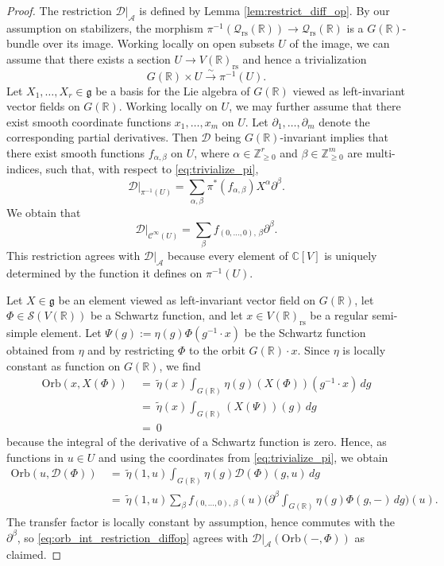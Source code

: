 \documentclass[reqno, 11pt]{amsart} %
\numberwithin{equation}{section}
\theoremstyle{plain}
\theoremstyle{definition}
\theoremstyle{remark}
\newcommand{\mr}{\mathrm}
\newcommand{\wt}{\widetilde}
\newcommand{\lr}{\longrightarrow}
\newcommand{\mbC}{\mathbb{C}}
\newcommand{\mbR}{\mathbb{R}}
\newcommand{\mbZ}{\mathbb{Z}}
\newcommand{\mcA}{\mathcal{A}}
\newcommand{\mcC}{\mathcal{C}}
\newcommand{\mcD}{\mathcal{D}}
\newcommand{\mcQ}{\mathcal{Q}}
\newcommand{\mcS}{\mathcal{S}}
\newcommand{\mfg}{\mathfrak{g}}
\newcommand{\rs}{\mr{rs}}
\newcommand{\simlr}{\overset{\sim}{\lr}}
\newcommand{\Orb}{\mathrm{Orb}}
\begin{document}
\begin{proof}
The restriction $\mcD\vert_\mcA$ is defined by Lemma \ref{lem:restrict_diff_op}. By our assumption on stabilizers, the morphism $π^{-1}(\mcQ_\rs(\mbR))\to \mcQ_\rs(\mbR)$ is a $G(\mbR)$-bundle over its image. Working locally on open subsets $U$ of the image, we can assume that there exists a section $U\to V(\mbR)_\rs$ and hence a trivialization
\begin{equation}\label{eq:trivialize_pi}
G(\mbR)\times U \simlr π^{-1}(U).
\end{equation}
Let $X_1,\ldots,X_r \in \mfg$ be a basis for the Lie algebra of $G(\mbR)$ viewed as left-invariant vector fields on $G(\mbR)$. Working locally on $U$, we may further assume that there exist smooth coordinate functions $x_1,\ldots,x_m$ on $U$. Let $\partial_1,\ldots, \partial_m$ denote the corresponding partial derivatives. Then $\mcD$ being $G(\mbR)$-invariant implies that there exist smooth functions $f_{α,β}$ on $U$, where $α\in \mbZ_{\geq 0}^r$ and $β\in \mbZ_{\geq 0}^m$ are multi-indices, such that, with respect to \eqref{eq:trivialize_pi},
$$\mcD\vert_{π^{-1}(U)} = \sum_{α, β} π^*(f_{α,β}) X^α\partial^β.$$
We obtain that
$$\mcD\vert_{\mcC^\infty(U)} = \sum_{β} f_{(0,\ldots,0),\, β} \partial^β.$$
This restriction agrees with $\mcD\vert_{\mcA}$ because every element of $\mbC[V]$ is uniquely determined by the function it defines on $π^{-1}(U)$.

Let $X\in \mfg$ be an element viewed as left-invariant vector field on $G(\mbR)$, let $Φ\in \mcS(V(\mbR))$ be a Schwartz function, and let $x\in V(\mbR)_\rs$ be a regular semi-simple element. Let $Ψ(g) := η(g)Φ(g^{-1}\cdot x)$ be the Schwartz function obtained from $η$ and by restricting $Φ$ to the orbit $G(\mbR)\cdot x$. Since $η$ is locally constant as function on $G(\mbR)$, we find
\begin{equation}\label{eq:orb_int_vanishing_derivative}
\begin{aligned}
\Orb(x, X(Φ)) &\ =\ \wt{η}(x)\int_{G(\mbR)} η(g) (X(Φ))(g^{-1}\cdot x)\, dg\\[1mm]
&\ =\ \wt{η}(x)\int_{G(\mbR)} (X(Ψ))(g)\,dg\\
&\ =\ 0
\end{aligned}
\end{equation}
because the integral of the derivative of a Schwartz function is zero. Hence, as functions in $u\in U$ and using the coordinates from \eqref{eq:trivialize_pi}, we obtain
\begin{equation}\label{eq:orb_int_restriction_diffop}
\begin{aligned}
\Orb(u, \mcD(Φ)) &\ =\ \wt{η}(1,u) \int_{G(\mbR)} η(g) \mcD(Φ)(g,u)\,dg\\[1mm]
&\ =\ \wt{η}(1,u) \sum_{β} f_{(0,\ldots,0),\, β}(u) \Big(\partial^β \int_{G(\mbR)} η(g)Φ(g,-)\,dg\Big)(u).
\end{aligned}
\end{equation}
The transfer factor is locally constant by assumption, hence commutes with the $\partial^β$, so \eqref{eq:orb_int_restriction_diffop} agrees with $\mcD\vert_{\mcA}(\Orb(-, Φ))$ as claimed.
\end{proof}
\end{document}
